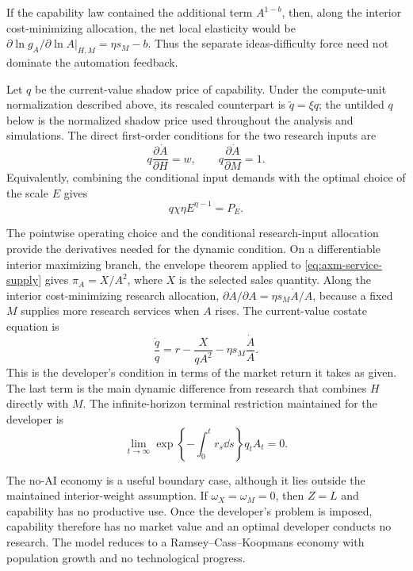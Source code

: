 If the capability law contained the additional term \(A^{1-b}\), then, along
the interior cost-minimizing allocation, the net local elasticity would be
\(\partial\ln g_A/\partial\ln A\vert_{H,M}=\eta s_M-b\). Thus the separate
ideas-difficulty force need not dominate the automation feedback.

Let \(q\) be the current-value shadow price of capability. Under the compute-unit
normalization described above, its rescaled counterpart is
\(\widetilde q=\xi q\); the untilded \(q\) below is the normalized shadow price
used throughout the analysis and simulations. The direct first-order conditions
for the two research inputs are
\begin{equation}
 q\frac{\partial\dot A}{\partial H}=w,\qquad
 q\frac{\partial\dot A}{\partial M}=1.
 \label{eq:axm-research-focs}
\end{equation}
Equivalently, combining the conditional input demands with the optimal choice of
the scale \(E\) gives
\begin{equation}
 q\chi\eta E^{\eta-1}=P_E.
 \label{eq:axm-research-scale-foc}
\end{equation}

The pointwise operating choice and the conditional research-input allocation
provide the derivatives needed for the dynamic condition. On a differentiable
interior maximizing branch, the envelope theorem applied to
\eqref{eq:axm-service-supply} gives \(\pi_A=X/A^2\), where \(X\) is the selected
sales quantity. Along the interior cost-minimizing research allocation,
\(\partial\dot A/\partial A=\eta s_M\dot A/A\), because a fixed \(M\) supplies
more research services when \(A\) rises. The current-value costate equation is
\begin{equation}
 \frac{\dot q}{q}=r-\frac{X}{qA^2}
 -\eta s_M\frac{\dot A}{A}.
 \label{eq:axm-costate}
\end{equation}
This is the developer's condition in terms of the market return it takes as
given. The last term is the main dynamic difference from research that combines
\(H\) directly with \(M\). The infinite-horizon terminal restriction maintained
for the developer is
\begin{equation}
 \lim_{t\to\infty}
 \exp\left\{-\int_0^t r_s\dd s\right\}q_tA_t=0.
 \label{eq:axm-developer-tvc}
\end{equation}

\begin{remark}
The no-AI economy is a useful boundary case, although it lies outside the
maintained interior-weight assumption. If \(\omega_X=\omega_M=0\), then
\(Z=L\) and capability has no productive use. Once the developer's problem is
imposed, capability therefore has no market value and an optimal developer
conducts no research. The model reduces to a Ramsey--Cass--Koopmans economy with
population growth and no technological progress.
\end{remark}

